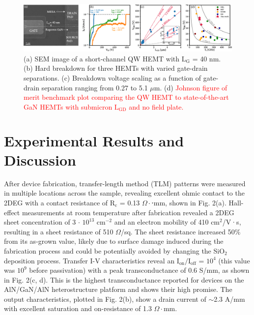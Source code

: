 \documentclass[journal]{IEEEtran}
\begin{document}
\begin{figure}[!t]
\centering
\includegraphics[width=\textwidth]{Figure4_JFoM.eps}
\caption{ (a) SEM image of a short-channel QW HEMT with $\mathrm{L_G}$ = 40 nm. (b) Hard breakdown for three HEMTs with varied gate-drain separations. (c) Breakdown voltage scaling as a function of gate-drain separation ranging from 0.27 to 5.1 $\mu$m. (d) \textcolor{red}{Johnson figure of merit benchmark plot comparing the QW HEMT to state-of-the-art GaN HEMTs with submicron $\mathrm{L_{GD}}$ and no field plate.} }
\label{fig:benchmark}
\end{figure}

\section{Experimental Results and Discussion}
\label{sec:Experimental Results and Discussion}
After device fabrication, transfer-length method (TLM) patterns were measured in multiple locations across the sample, revealing excellent ohmic contact to the 2DEG with a contact resistance of $\mathrm{R_c}$ = 0.13 $\Omega\cdot$⋅mm, shown in Fig. 2(a). Hall-effect measurements at room temperature after fabrication revealed a 2DEG sheet concentration of 3 $\cdot$ $\mathrm{10^{13}}$ $\mathrm{cm^{-2}}$ and an electron mobility of 410 $\mathrm{cm^2}$/V·s, resulting in a sheet resistance of 510 $\Omega$/sq. The sheet resistance increased 50\% from its as-grown value, likely due to surface damage induced during the fabrication process and could be potentially avoided by changing the $\mathrm{SiO_2}$ deposition process. Transfer I-V characteristics reveal an $\mathrm{I_{on}}/\mathrm{I_{off}}$ = $\mathrm{10^4}$ (this value was $\mathrm{10^9}$ before passivation) with a peak transconductance of 0.6 S/mm, as shown in Fig. 2(c, d). This is the highest transconductance reported for devices on the AlN/GaN/AlN heterostructure platform and shows their high promise. The output characteristics, plotted in Fig. 2(b), show a drain current of $\sim$2.3 A/mm with excellent saturation and on-resistance of 1.3 $\Omega\cdot$mm.
\end{document}
